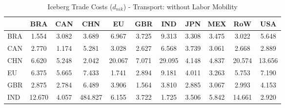 \begin{table}[htbp]
\centering
\caption{Iceberg Trade Costs ($d_{nik}$) - Transport: without Labor Mobility} 
\label{tab:iceberg_Transport}
\begin{tabular}{lcccccccccc}
  \hline
 & BRA & CAN & CHN & EU & GBR & IND & JPN & MEX & RoW & USA \\ 
  \hline
BRA & \textcolor[RGB]{247,160,8}{1.554} & \textcolor[RGB]{178,115,76}{3.082} & \textcolor[RGB]{150,97,105}{3.689} & \textcolor[RGB]{43,28,212}{6.967} & \textcolor[RGB]{145,94,110}{3.725} & \textcolor[RGB]{23,15,232}{9.313} & \textcolor[RGB]{166,107,89}{3.308} & \textcolor[RGB]{163,106,92}{3.475} & \textcolor[RGB]{189,122,66}{3.022} & \textcolor[RGB]{74,48,181}{5.648} \\ 
  CAN & \textcolor[RGB]{217,140,38}{2.770} & \textcolor[RGB]{252,163,3}{1.174} & \textcolor[RGB]{84,54,171}{5.281} & \textcolor[RGB]{186,120,69}{3.028} & \textcolor[RGB]{222,144,33}{2.627} & \textcolor[RGB]{48,31,207}{6.568} & \textcolor[RGB]{143,92,112}{3.739} & \textcolor[RGB]{184,119,71}{3.061} & \textcolor[RGB]{219,142,36}{2.668} & \textcolor[RGB]{204,132,51}{2.889} \\ 
  CHN & \textcolor[RGB]{46,30,209}{6.620} & \textcolor[RGB]{87,56,168}{5.248} & \textcolor[RGB]{232,150,23}{2.042} & \textcolor[RGB]{8,5,247}{20.067} & \textcolor[RGB]{41,26,214}{7.071} & \textcolor[RGB]{3,2,252}{29.095} & \textcolor[RGB]{117,76,138}{4.148} & \textcolor[RGB]{97,63,158}{4.837} & \textcolor[RGB]{5,3,250}{20.574} & \textcolor[RGB]{13,8,242}{13.656} \\ 
  EU & \textcolor[RGB]{54,35,201}{6.375} & \textcolor[RGB]{71,46,184}{5.665} & \textcolor[RGB]{31,20,224}{7.433} & \textcolor[RGB]{240,155,15}{1.741} & \textcolor[RGB]{201,130,54}{2.894} & \textcolor[RGB]{25,16,230}{9.181} & \textcolor[RGB]{128,82,128}{4.011} & \textcolor[RGB]{168,109,87}{3.263} & \textcolor[RGB]{69,45,186}{5.753} & \textcolor[RGB]{38,25,217}{7.190} \\ 
  GBR & \textcolor[RGB]{209,135,46}{2.875} & \textcolor[RGB]{214,139,41}{2.784} & \textcolor[RGB]{51,33,204}{6.489} & \textcolor[RGB]{133,86,122}{3.906} & \textcolor[RGB]{245,158,10}{1.564} & \textcolor[RGB]{140,91,115}{3.810} & \textcolor[RGB]{207,134,48}{2.885} & \textcolor[RGB]{181,117,74}{3.067} & \textcolor[RGB]{191,124,64}{2.993} & \textcolor[RGB]{115,74,140}{4.153} \\ 
  IND & \textcolor[RGB]{15,10,240}{12.670} & \textcolor[RGB]{122,79,133}{4.057} & \textcolor[RGB]{0,0,255}{484.827} & \textcolor[RGB]{61,40,194}{6.155} & \textcolor[RGB]{148,96,107}{3.722} & \textcolor[RGB]{242,157,13}{1.725} & \textcolor[RGB]{158,102,97}{3.506} & \textcolor[RGB]{66,43,189}{5.842} & \textcolor[RGB]{10,7,245}{14.661} & \textcolor[RGB]{199,129,56}{2.920} \\ 

\end{tabular}
\end{table}
